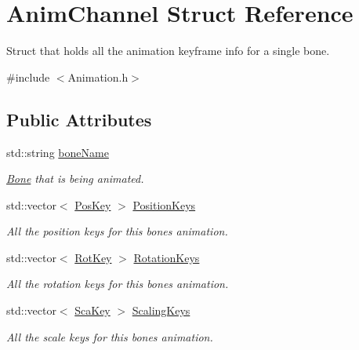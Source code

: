 \hypertarget{structAnimChannel}{}\section{Anim\+Channel Struct Reference}
\label{structAnimChannel}


Struct that holds all the animation keyframe info for a single bone.  




{\ttfamily \#include $<$Animation.\+h$>$}

\subsection*{Public Attributes}
\begin{DoxyCompactItemize}
\item 
\mbox{\label{structAnimChannel_ae8ef1d4ed06cee3b78e6ae9b1f5ffb72}} 
std\+::string \hyperlink{structAnimChannel_ae8ef1d4ed06cee3b78e6ae9b1f5ffb72}{bone\+Name}
\begin{DoxyCompactList}\small\item\em \hyperlink{structBone}{Bone} that is being animated. \end{DoxyCompactList}\item 
\mbox{\label{structAnimChannel_a7cc45c3dde2b32f0adc2f0b1d3f446b4}} 
std\+::vector$<$ \hyperlink{structPosKey}{Pos\+Key} $>$ \hyperlink{structAnimChannel_a7cc45c3dde2b32f0adc2f0b1d3f446b4}{Position\+Keys}
\begin{DoxyCompactList}\small\item\em All the position keys for this bone\textquotesingle{}s animation. \end{DoxyCompactList}\item 
\mbox{\label{structAnimChannel_a22d7a0a91617e84bbd37480cb16c2c6c}} 
std\+::vector$<$ \hyperlink{structRotKey}{Rot\+Key} $>$ \hyperlink{structAnimChannel_a22d7a0a91617e84bbd37480cb16c2c6c}{Rotation\+Keys}
\begin{DoxyCompactList}\small\item\em All the rotation keys for this bone\textquotesingle{}s animation. \end{DoxyCompactList}\item 
\mbox{\label{structAnimChannel_a1811e8986219569ddcf8a5e39c464892}} 
std\+::vector$<$ \hyperlink{structScaKey}{Sca\+Key} $>$ \hyperlink{structAnimChannel_a1811e8986219569ddcf8a5e39c464892}{Scaling\+Keys}
\begin{DoxyCompactList}\small\item\em All the scale keys for this bone\textquotesingle{}s animation. \end{DoxyCompactList}\end{DoxyCompactItemize}


